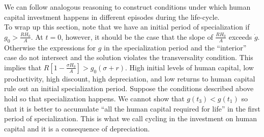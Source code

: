 \noindent We can follow analogous reasoning to construct conditions under which human capital investment happens in different episodes during the life-cycle.\\
\indent To wrap up this section, note that we have an initial period of specialization if $g_{0} > \frac{R H_{0}}{A}$. At $t=0$, however, it should be the case that the slope of $\frac{R H_{0}}{A}$ exceeds $\dot{g}$. Otherwise the expressions for $g$ in the specialization period and the ``interior'' case do not intersect and the solution violates the transversality condition. This implies that $R \left[ 1 - \frac{\sigma H_{0}}{A} \right] > g_{0}(\sigma + r)$. High initial levels of human capital, low productivity, high discount, high depreciation, and low returns to human capital rule out an initial specialization period. Suppose the conditions described above hold so that specialization happens. We cannot show that $g(t_{3}) < g(t_{1})$ so that it is better to accumulate ``all the human capital required for life'' in the first period of specialization. This is what we call cycling in the investment on human capital and it is a consequence of depreciation.










